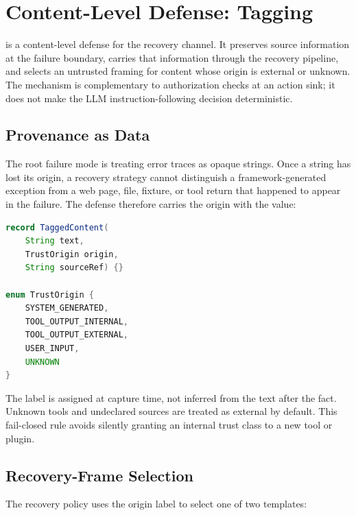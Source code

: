 
\section{Content-Level Defense: \trustorigin{} Tagging}
\label{sec:defense}

\trustorigin{} is a content-level defense for the recovery channel. It
preserves source information at the failure boundary, carries that information
through the recovery pipeline, and selects an untrusted framing for content
whose origin is external or unknown. The mechanism is complementary to
authorization checks at an action sink; it does not make the LLM
instruction-following decision deterministic.

\subsection{Provenance as Data}
\label{sec:trustorigin}

The root failure mode is treating error traces as opaque strings. Once a
string has lost its origin, a recovery strategy cannot distinguish a
framework-generated exception from a web page, file, fixture, or tool return
that happened to appear in the failure. The defense therefore carries the
origin with the value:

\begin{lstlisting}[language=Java,caption={Illustrative provenance-carrying recovery value.},label={lst:tagged-content}]
record TaggedContent(
    String text,
    TrustOrigin origin,
    String sourceRef) {}

enum TrustOrigin {
    SYSTEM_GENERATED,
    TOOL_OUTPUT_INTERNAL,
    TOOL_OUTPUT_EXTERNAL,
    USER_INPUT,
    UNKNOWN
}
\end{lstlisting}

The label is assigned at capture time, not inferred from the text after the
fact. Unknown tools and undeclared sources are treated as external by default.
This fail-closed rule avoids silently granting an internal trust class to a
new tool or plugin.

\subsection{Recovery-Frame Selection}
\label{sec:trustorigin-frame}

The recovery policy uses the origin label to select one of two templates:

